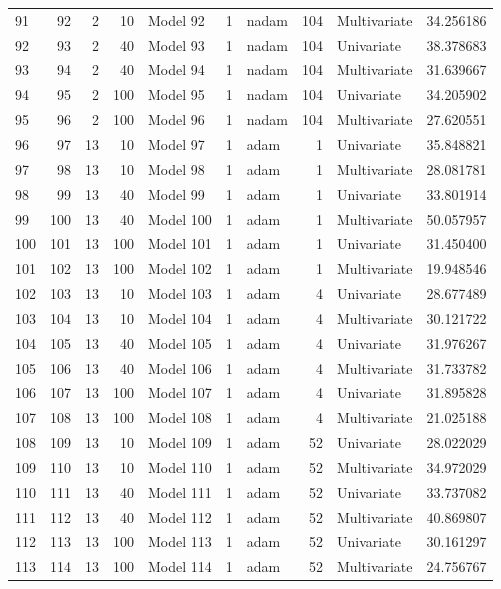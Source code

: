 \begin{tabular}{lrrrlrlrlr}
91 & 92 & 2 & 10 & Model 92 & 1 & nadam & 104 & Multivariate & 34.256186 \\
92 & 93 & 2 & 40 & Model 93 & 1 & nadam & 104 & Univariate & 38.378683 \\
93 & 94 & 2 & 40 & Model 94 & 1 & nadam & 104 & Multivariate & 31.639667 \\
94 & 95 & 2 & 100 & Model 95 & 1 & nadam & 104 & Univariate & 34.205902 \\
95 & 96 & 2 & 100 & Model 96 & 1 & nadam & 104 & Multivariate & 27.620551 \\
96 & 97 & 13 & 10 & Model 97 & 1 & adam & 1 & Univariate & 35.848821 \\
97 & 98 & 13 & 10 & Model 98 & 1 & adam & 1 & Multivariate & 28.081781 \\
98 & 99 & 13 & 40 & Model 99 & 1 & adam & 1 & Univariate & 33.801914 \\
99 & 100 & 13 & 40 & Model 100 & 1 & adam & 1 & Multivariate & 50.057957 \\
100 & 101 & 13 & 100 & Model 101 & 1 & adam & 1 & Univariate & 31.450400 \\
101 & 102 & 13 & 100 & Model 102 & 1 & adam & 1 & Multivariate & 19.948546 \\
102 & 103 & 13 & 10 & Model 103 & 1 & adam & 4 & Univariate & 28.677489 \\
103 & 104 & 13 & 10 & Model 104 & 1 & adam & 4 & Multivariate & 30.121722 \\
104 & 105 & 13 & 40 & Model 105 & 1 & adam & 4 & Univariate & 31.976267 \\
105 & 106 & 13 & 40 & Model 106 & 1 & adam & 4 & Multivariate & 31.733782 \\
106 & 107 & 13 & 100 & Model 107 & 1 & adam & 4 & Univariate & 31.895828 \\
107 & 108 & 13 & 100 & Model 108 & 1 & adam & 4 & Multivariate & 21.025188 \\
108 & 109 & 13 & 10 & Model 109 & 1 & adam & 52 & Univariate & 28.022029 \\
109 & 110 & 13 & 10 & Model 110 & 1 & adam & 52 & Multivariate & 34.972029 \\
110 & 111 & 13 & 40 & Model 111 & 1 & adam & 52 & Univariate & 33.737082 \\
111 & 112 & 13 & 40 & Model 112 & 1 & adam & 52 & Multivariate & 40.869807 \\
112 & 113 & 13 & 100 & Model 113 & 1 & adam & 52 & Univariate & 30.161297 \\
113 & 114 & 13 & 100 & Model 114 & 1 & adam & 52 & Multivariate & 24.756767 \\

\end{tabular}
